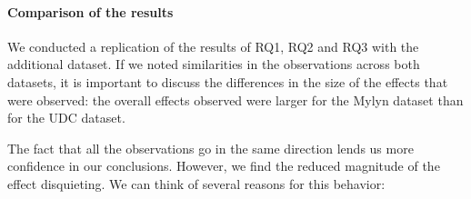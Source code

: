 \documentclass[times]{smrauth}
\begin{document}





\paragraph{Comparison of the results}

We conducted a replication of the results of RQ1, RQ2 and RQ3 with the additional dataset. If we noted similarities in the observations across both datasets, it is important to discuss the differences in the size of the effects that were observed: the overall effects observed were larger for the Mylyn dataset than for the UDC dataset.

The fact that all the observations go in the same direction lends us more confidence in our conclusions. However, we find the reduced magnitude of the effect disquieting. We can think of several reasons for this behavior:
\end{document}
